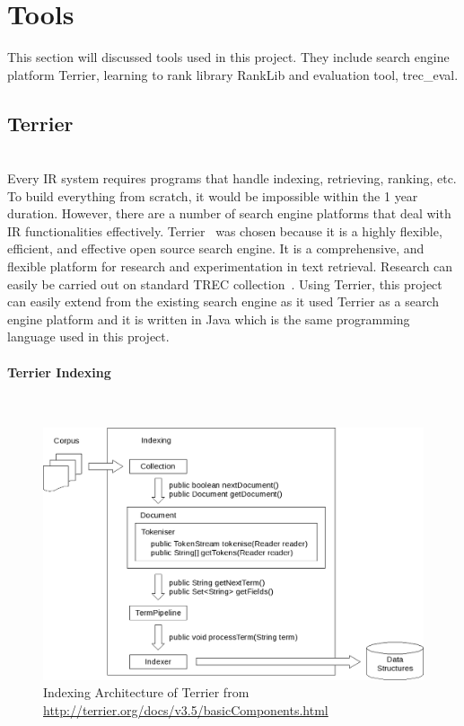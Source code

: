 \section{Tools}
This section will discussed tools used in this project. They include search engine platform Terrier, learning to rank library RankLib and evaluation tool,
trec\_eval.
\subsection{Terrier}\label{section:terrier} \hspace{0pt} \\
Every IR system requires programs that handle indexing, retrieving, ranking, etc. To build everything from scratch, it would be impossible within
the 1 year duration. However, there are a number of search engine platforms that deal with IR functionalities effectively.
Terrier~\cite{terrier} was chosen because it is a highly flexible, efficient, and effective open source search engine.
It is a comprehensive, and flexible platform for research and experimentation in text retrieval. Research can easily be 
carried out on standard TREC collection~\cite{trec}. 
Using Terrier, this project can easily extend from the existing search engine as it used Terrier as a search engine platform and it is written in Java
which is the same programming language used in this project.

\paragraph{Terrier Indexing} \hspace{0pt} \\
\begin{figure}
\centering
\includegraphics[scale=0.3]{./figures/terrierindexing.png}
\caption{Indexing Architecture of Terrier from \protect\url{http://terrier.org/docs/v3.5/basicComponents.html}} \label{fig:terrierindexing} 
\end{figure}

